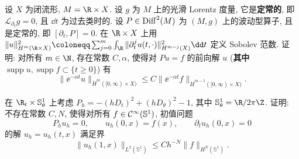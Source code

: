 \begin{exer}[定常波动方程的指数界]\label{ex:9.11}
设 $X$ 为闭流形, $M = \R \times X$. 设 $g$ 为 $M$ 上的光滑 Lorentz 度量, 它是\textbf{定常的}, 即 $\mathcal{L}_{\partial_t} g = 0$, 且 $\dd t$ 为过去类时的. 设 $P \in \operatorname{Diff}^2(M)$ 为 $(M, g)$ 上的波动型算子, 且是定常的, 即 $[\partial_t, P] = 0$. 在 $\R \times X$ 上用 $\|u\|_{H^m(\R \times X)}^2 \defeq \sum_{j=0}^{m} \int_{\R} \|\partial_t^j u(t, \cdot)\|_{H^{m-j}(X)}^2 \dd t$ 定义 Sobolev 范数. 证明: 对所有 $m \in \N$, 存在常数 $C, \alpha$, 使得对 $P u = f$ 的前向解 $u$ (\textbf{其中} $\operatorname{supp} u, \operatorname{supp} f \subset \{t \ge 0\}$) 有
\begin{equation}\label{eq:9.165}
    \|\ee^{-\alpha t} u\|_{\dot{H}^m([0, \infty) \times X)} \le C \|\ee^{-\alpha t} f\|_{\dot{H}^{m-1}([0, \infty) \times X)}.
\end{equation}
\end{exer}

\begin{exer}[不是半经典波动型算子]\label{ex:9.12}
在 $\R_t \times \mathbb{S}_\theta^1$ 上考虑 $P_h = -(h D_t)^2 + (h D_\theta)^2 - 1$, 其中 $\mathbb{S}_\theta^1 = \R / 2\pi\Z$. 证明: 不存在常数 $C, N$, 使得对所有 $f \in \mathcal{C}^\infty(\mathbb{S}^1)$, 初值问题
\begin{equation}\label{eq:9.166}
    P_h u_h = 0, \qquad u_h(0, x) = f(x), \qquad \partial_t u_h(0, x) = 0
\end{equation}
的解 $u_h = u_h(t, x)$ 满足界
\begin{equation}\label{eq:9.167}
    \|u_h(1, x)\|_{L^2(\mathbb{S}^1)} \le C h^{-N} \|f\|_{H^N(\mathbb{S}^1)}.
\end{equation}
\end{exer}
